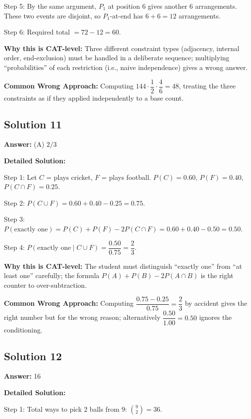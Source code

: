 \documentclass[11pt,a4paper]{article}
\begin{document}
Step 5: By the same argument, \(P_1\) at position 6 gives another \(6\) arrangements. These two events are disjoint, so \(P_1\)-at-end has \(6 + 6 = 12\) arrangements.

Step 6: Required total \(= 72 - 12 = 60\).

\textbf{Why this is CAT-level:} Three different constraint types (adjacency, internal order, end-exclusion) must be handled in a deliberate sequence; multiplying ``probabilities'' of each restriction (i.e., naive independence) gives a wrong answer.

\textbf{Common Wrong Approach:} Computing \(144 \cdot \dfrac{1}{2} \cdot \dfrac{4}{6} = 48\), treating the three constraints as if they applied independently to a base count.

\subsection*{Solution 11}
\textbf{Answer:} (A) \(2/3\)

\textbf{Detailed Solution:}

Step 1: Let \(C\) = plays cricket, \(F\) = plays football. \(P(C) = 0.60\), \(P(F) = 0.40\), \(P(C \cap F) = 0.25\).

Step 2: \(P(C \cup F) = 0.60 + 0.40 - 0.25 = 0.75\).

Step 3: \(P(\text{exactly one}) = P(C) + P(F) - 2 P(C \cap F) = 0.60 + 0.40 - 0.50 = 0.50\).

Step 4: \(P(\text{exactly one} \mid C \cup F) = \dfrac{0.50}{0.75} = \dfrac{2}{3}\).

\textbf{Why this is CAT-level:} The student must distinguish ``exactly one'' from ``at least one'' carefully; the formula \(P(A) + P(B) - 2 P(A \cap B)\) is the right counter to over-subtraction.

\textbf{Common Wrong Approach:} Computing \(\dfrac{0.75 - 0.25}{0.75} = \dfrac{2}{3}\) by accident gives the right number but for the wrong reason; alternatively \(\dfrac{0.50}{1.00} = 0.50\) ignores the conditioning.

\subsection*{Solution 12}
\textbf{Answer:} 16

\textbf{Detailed Solution:}

Step 1: Total ways to pick 2 balls from 9: \(\binom{9}{2} = 36\).
\end{document}
